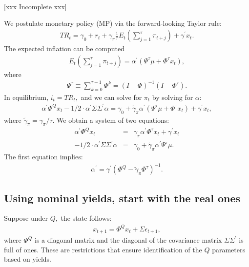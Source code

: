 \documentclass[11pt]{article}
\begin{document}
[xxx Incomplete xxx]

We postulate monetary policy (MP) via the forward-looking Taylor rule:
\begin{eqnarray}
      TR_t = \gamma_0 + r_t + \gamma_{\pi}\frac{1}{\tau} E_t \left(\sum_{j=1}^{\tau} \pi_{t+j} \right) + \gamma^{\prime} x_t.
\end{eqnarray}
The expected inflation can be computed
\begin{eqnarray}
   E_t \left(\sum_{j=1}^{\tau} \pi_{t+j} \right)= \alpha^{\prime}\left(\Psi^{\tau}\mu+\Phi^{\tau}x_t\right),
\end{eqnarray}
where
\begin{eqnarray}
   \label{psinot}
   \Psi^{\tau}\equiv \sum_{k=0}^{\tau-1}\Phi^k=\left(I-\Phi\right)^{-1}\left(I-\Phi^{\tau}\right).
\end{eqnarray}
In equilibrium,  $i_t=TR_t,$ and we can solve for $\pi_t$ by solving for $\alpha:$
\begin{eqnarray}
    \alpha^{\prime}\Phi^Q x_t  -1/2\cdot  \alpha^{\prime} \Sigma \Sigma^{\prime} \alpha=  \gamma_0 + \tilde{\gamma}_{\pi}\alpha^{\prime}\left(\Psi^{\tau}\mu+\Phi^{\tau}x_t\right)+ \gamma^{\prime} x_t,
\end{eqnarray}
where $\tilde{\gamma}_{\pi}=\gamma_{\pi}/\tau.$ We obtain a system of two equations:
 \begin{eqnarray}
     \alpha^{\prime}\Phi^Q x_t & = &\gamma_{\pi}\alpha^{\prime}\Phi^{\tau}x_t+ \gamma^{\prime} x_t \\
     -1/2\cdot  \alpha^{\prime} \Sigma \Sigma^{\prime} \alpha &=& \gamma_0 + \tilde{\gamma}_{\pi}\alpha^{\prime}\Psi^{\tau}\mu.
 \end{eqnarray}
 The first equation implies:
 \begin{eqnarray}
     \alpha^{\prime}=\gamma^{\prime} \left(\Phi^Q-\tilde{\gamma}_{\pi} \Phi^{\tau}\right)^{-1}.
 \end{eqnarray}

 \subsection*{Using nominal yields, start with the real ones}

 Suppose under $Q,$ the state follows:
\begin{eqnarray}
     x_{t+1}=\Phi^Q x_t + \Sigma \epsilon_{t+1},
\end{eqnarray}
where $\Phi^Q$ is a diagonal matrix and the diagonal of the covariance matrix $\Sigma \Sigma^{\prime}$ is full of ones. These are restrictions that ensure identification of the $Q$ parameters based on yields.
\end{document}
